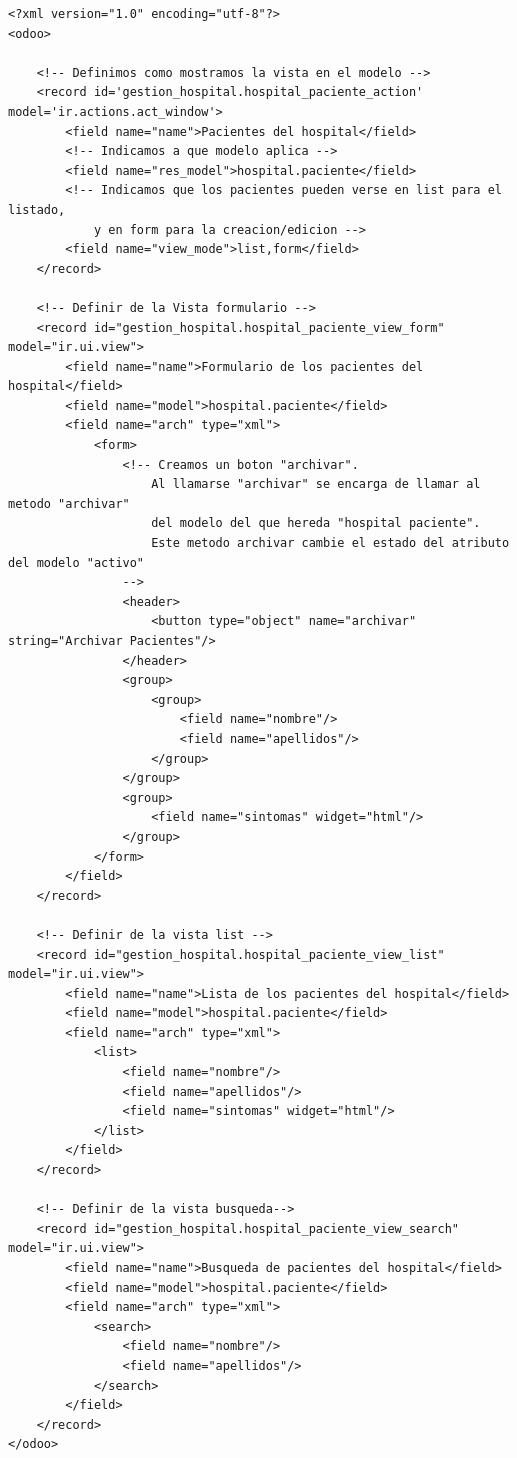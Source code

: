 \documentclass[a4paper,12pt]{article}
\begin{document}
\vspace{0.5cm}
\begin{lstlisting}[style=javascript]
<?xml version="1.0" encoding="utf-8"?>
<odoo>

    <!-- Definimos como mostramos la vista en el modelo -->
    <record id='gestion_hospital.hospital_paciente_action' model='ir.actions.act_window'>
        <field name="name">Pacientes del hospital</field>
        <!-- Indicamos a que modelo aplica -->
        <field name="res_model">hospital.paciente</field>
        <!-- Indicamos que los pacientes pueden verse en list para el listado,
            y en form para la creacion/edicion -->
        <field name="view_mode">list,form</field>
    </record>

    <!-- Definir de la Vista formulario -->
    <record id="gestion_hospital.hospital_paciente_view_form" model="ir.ui.view">
        <field name="name">Formulario de los pacientes del hospital</field>
        <field name="model">hospital.paciente</field>
        <field name="arch" type="xml">
            <form>
                <!-- Creamos un boton "archivar". 
                    Al llamarse "archivar" se encarga de llamar al metodo "archivar"
                    del modelo del que hereda "hospital paciente".
                    Este metodo archivar cambie el estado del atributo del modelo "activo"
                -->
                <header>
                    <button type="object" name="archivar" string="Archivar Pacientes"/>
                </header>
                <group>
                    <group>
                        <field name="nombre"/>
                        <field name="apellidos"/>
                    </group>
                </group>
                <group>
                    <field name="sintomas" widget="html"/>
                </group>
            </form>
        </field>
    </record>

    <!-- Definir de la vista list -->
    <record id="gestion_hospital.hospital_paciente_view_list" model="ir.ui.view">
        <field name="name">Lista de los pacientes del hospital</field>
        <field name="model">hospital.paciente</field>
        <field name="arch" type="xml">
            <list>
                <field name="nombre"/>
                <field name="apellidos"/>                        
                <field name="sintomas" widget="html"/>
            </list>
        </field>
    </record>

    <!-- Definir de la vista busqueda-->
    <record id="gestion_hospital.hospital_paciente_view_search" model="ir.ui.view">
        <field name="name">Busqueda de pacientes del hospital</field>
        <field name="model">hospital.paciente</field>
        <field name="arch" type="xml">
            <search>
                <field name="nombre"/>
                <field name="apellidos"/>
            </search>
        </field>
    </record>
</odoo>
\end{lstlisting}
\end{document}
